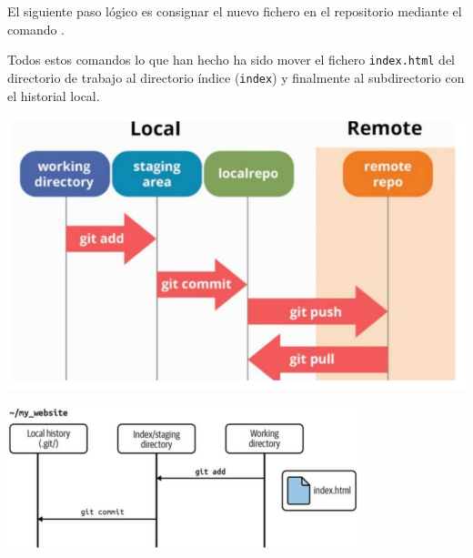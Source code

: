 \begin{minipage}{0.5\textwidth}
	El siguiente paso lógico es consignar el nuevo fichero en el repositorio mediante el comando .
	
	Todos estos comandos lo que han hecho ha sido mover el fichero \texttt{index.html} del directorio de trabajo al directorio índice (\texttt{index}) y finalmente al subdirectorio con el historial local.
\end{minipage}\qquad\begin{minipage}{0.45\textwidth}
\begin{center}
	\includegraphics[width=\linewidth]{"Temas/Tema 1/screenshot006"}
\end{center}
\end{minipage}
\begin{center}
	\includegraphics{"Temas/Tema 1/screenshot007"}
\end{center}
